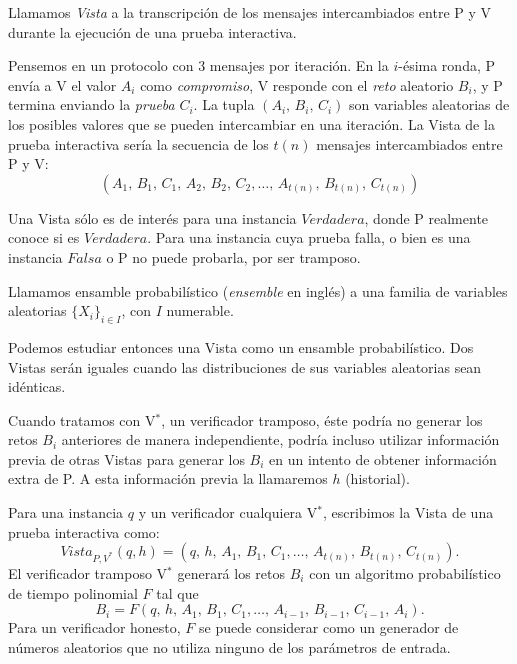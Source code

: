 \begin{definition}
	Llamamos \textit{Vista} a la transcripción de los mensajes intercambiados entre P y V durante la ejecución de una prueba interactiva.
\end{definition}


Pensemos en un protocolo con 3 mensajes por iteración. En la $i$-ésima ronda, P envía a V el valor $A_i$ como \textit{compromiso}, V responde con el \textit{reto} aleatorio $B_i$, y P termina enviando la \textit{prueba} $C_i$. La tupla $(A_i,\,B_i,\,C_i)$ son variables aleatorias de los posibles valores que se pueden intercambiar en una iteración. La Vista de la prueba interactiva sería la secuencia de los $t(n)$ mensajes intercambiados entre P y V:
\[(A_1,\,B_1,\,C_1,\,A_2,\,B_2,\,C_2,\dots ,\,A_{t(n)},\,B_{t(n)},\,C_{t(n)})\]


Una Vista sólo es de interés para una instancia $Verdadera$, donde P realmente conoce si es $Verdadera$. Para una instancia cuya prueba falla, o bien es una instancia $Falsa$ o P no puede probarla, por ser tramposo.


\begin{definition}
	Llamamos ensamble probabilístico (\textit{ensemble} en inglés) a una familia de variables aleatorias $\{X_i\}_{i\in I}$, con $I$ numerable.
\end{definition}

Podemos estudiar entonces una Vista como un ensamble probabilístico. Dos Vistas serán iguales cuando las distribuciones de sus variables aleatorias sean idénticas.


\hfil

Cuando tratamos con V$^*$, un verificador tramposo, éste podría no generar los retos $B_i$ anteriores de manera independiente, podría incluso utilizar información previa de otras Vistas para generar los $B_i$ en un intento de obtener información extra de P. A esta información previa la llamaremos $h$ (historial).

Para una instancia $q$ y un verificador cualquiera V$^*$, escribimos la Vista de una prueba interactiva como:
\[ Vista_{P,V^*}(q,h) = (q,\,h,\,A_1,\,B_1,\,C_1, \dots ,\,A_{t(n)},\,B_{t(n)},\,C_{t(n)}). \]
El verificador tramposo V$^*$ generará los retos $B_i$ con un algoritmo probabilístico de tiempo polinomial $F$ tal que
\[ B_i = F(q,\,h,\,A_1,\,B_1,\,C_1, \dots ,\,A_{i-1},\,B_{i-1},\,C_{i-1},\,A_i). \]
Para un verificador honesto, $F$ se puede considerar como un generador de números aleatorios que no utiliza ninguno de los parámetros de entrada.



